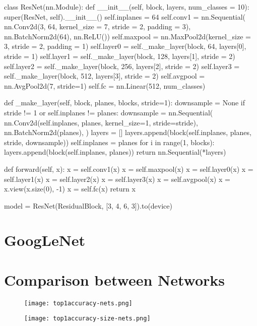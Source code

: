 \begin{python}
class ResNet(nn.Module):
	def __init__(self, block, layers, num_classes = 10):
		super(ResNet, self).__init__()
		self.inplanes = 64
		self.conv1 = nn.Sequential(
		nn.Conv2d(3, 64, kernel_size = 7, stride = 2, padding = 3),
		nn.BatchNorm2d(64),
		nn.ReLU())
		self.maxpool = nn.MaxPool2d(kernel_size = 3, stride = 2, padding = 1)
		self.layer0 = self._make_layer(block, 64, layers[0], stride = 1)
		self.layer1 = self._make_layer(block, 128, layers[1], stride = 2)
		self.layer2 = self._make_layer(block, 256, layers[2], stride = 2)
		self.layer3 = self._make_layer(block, 512, layers[3], stride = 2)
		self.avgpool = nn.AvgPool2d(7, stride=1)
		self.fc = nn.Linear(512, num_classes)
		
	def _make_layer(self, block, planes, blocks, stride=1):
		downsample = None
		if stride != 1 or self.inplanes != planes:
			downsample = nn.Sequential(
				nn.Conv2d(self.inplanes, planes, kernel_size=1, stride=stride),
				nn.BatchNorm2d(planes),
				)
		layers = []
		layers.append(block(self.inplanes, planes, stride, downsample))
		self.inplanes = planes
		for i in range(1, blocks):
			layers.append(block(self.inplanes, planes))
		return nn.Sequential(*layers)
	
	def forward(self, x):
		x = self.conv1(x)
		x = self.maxpool(x)
		x = self.layer0(x)
		x = self.layer1(x)
		x = self.layer2(x)
		x = self.layer3(x)
		x = self.avgpool(x)
		x = x.view(x.size(0), -1)
		x = self.fc(x)
		return x
	
model = ResNet(ResidualBlock, [3, 4, 6, 3]).to(device)
\end{python}

\section{GoogLeNet}
\todo{}

\section{Comparison between Networks}
\begin{figure}[hbt!]
	\centering
	\begin{minipage}{.5\textwidth}
		\centering
		\texttt{[image: top1accuracy-nets.png]}
		\label{fig:top1accuracy-nets}
	\end{minipage}%
	\begin{minipage}{.5\textwidth}
		\centering
		\texttt{[image: top1accuracy-size-nets.png]}
		\label{fig:top1accuracy-size-nets}
	\end{minipage}
\end{figure}

